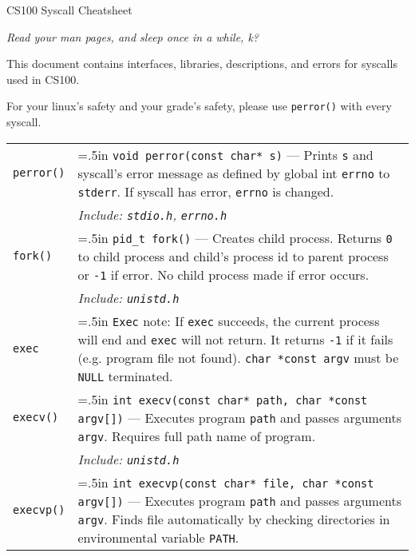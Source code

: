 \documentclass{article}
\newcommand{\indenth}[1][.5]{\hangindent=#1in
                         \hangafter=1 }
\begin{document}
\begin{center}
\huge CS100 Syscall Cheatsheet

\bigskip\it\large Read your man pages, and sleep once in a while, k?\rm
\end{center}

\centering\normalsize This document contains interfaces, libraries, descriptions, and errors for 
syscalls used in CS100. 

For your linux's safety and 
your grade's safety, please use \texttt{perror()} with every syscall.

\normalsize
\begin{longtabu}{|p{.9in}|p{6.3in}<{\strut}|} \hline \endhead \hline \endfoot
    \texttt{perror()} & \indenth\texttt{void perror(const char* s)} --- Prints \texttt{s} and syscall's error message as defined by global int \texttt{errno} to \texttt{stderr}. If syscall has error, \texttt{errno} is changed.
        \\ 
    & \hspace{.5in}\it Include: \rm\texttt{stdio.h}, \texttt{errno.h}
        \\ \hline
    \texttt{fork()} &  \indenth\texttt{pid\_t fork()} --- Creates child process. Returns \texttt{0} to child process and child's process id to parent process or \texttt{-1} if error. No child process made if error occurs.
        \\
    & \hspace{.5in}\it Include: \rm\texttt{unistd.h}
        \\ \hline
    \texttt{exec} & \indenth\texttt{Exec} note: If \texttt{exec} succeeds, the current process will end and \texttt{exec} will not return. It returns \texttt{-1} if it fails (e.g. program file not found). \texttt{char *const argv} must be \texttt{NULL} terminated. \par
        \\
    \texttt{execv()} & \indenth\texttt{int execv(const char* path, char *const argv[])} --- Executes program \texttt{path} and passes arguments \texttt{argv}. Requires full path name of program.
        \\
    & \hspace{.5in}\it Include: \rm\texttt{unistd.h}
        \\
    \texttt{execvp()} & \indenth\texttt{int execvp(const char* file, char *const argv[])} --- Executes program \texttt{path} and passes arguments \texttt{argv}. Finds file automatically by checking directories in environmental variable \texttt{PATH}.

\end{longtabu}
\end{document}
